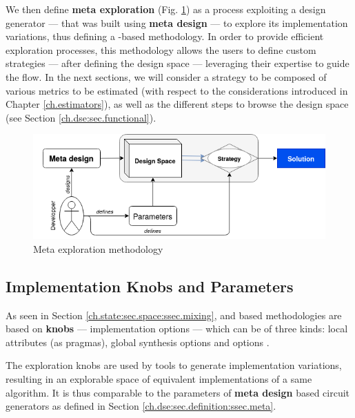 \clearpage
        We then define {\bf meta exploration} (Fig. \ref{ch.dse:sec.definition:ssec.meta:fig.meta-exploration}) as a process exploiting a design generator --- that was built using {\bf meta design} --- to explore its implementation variations, thus defining a -based  methodology.
        In order to provide efficient exploration processes, this methodology allows the users to define custom strategies --- after defining the design space --- leveraging their expertise to guide the flow.
        In the next sections, we will consider a strategy to be composed of various metrics to be estimated (with respect to the considerations introduced in Chapter \ref{ch.estimators}), as well as the different steps to browse the design space (see Section \ref{ch.dse:sec.functional}).
        \begin{figure}[h!]
            \centering
            \includegraphics[width=1.0\textwidth]{Figures/Methodology-metaexploration}
            \caption{Meta exploration methodology}
            \label{ch.dse:sec.definition:ssec.meta:fig.meta-exploration}
        \end{figure}

    \subsection{Implementation Knobs and Parameters}
    \label{ch.dse:sec.definition:ssec.knobs}

        As seen in Section \ref{ch.state:sec.space:ssec.mixing},  and  based  methodologies are based on {\bf knobs} --- \ie implementation options --- which can be of three kinds: local attributes (as pragmas), global synthesis options and  options \cite{schafer_high-level_2020}.

        The exploration knobs are used by  tools to generate implementation variations, resulting in an explorable space of equivalent implementations of a same algorithm.
        It is thus comparable to the parameters of {\bf meta design} based circuit generators as defined in Section \ref{ch.dse:sec.definition:ssec.meta}.

